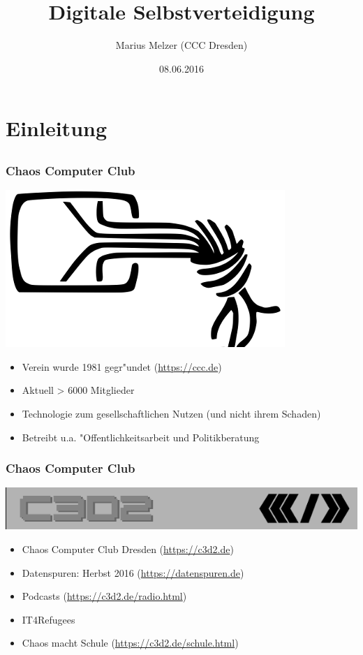 \documentclass[12pt, xcolor={svgnames,table}]{beamer}
\title{Digitale Selbstverteidigung}
\author{\small Marius Melzer (CCC Dresden)}
\date{08.06.2016}
\begin{document}
\maketitle

\section{Einleitung}
\subsection{}

\begin{frame}
    \frametitle{Chaos Computer Club}
    \begin{center}
	\includegraphics[height=0.2\textheight]{img/chaosknoten.png}
    \end{center}	
    \begin{itemize}
      \item<1-> Verein wurde 1981 gegr"undet (\url{https://ccc.de})
      \item<2-> Aktuell > 6000 Mitglieder
      \item<3-> Technologie zum gesellschaftlichen Nutzen (und nicht ihrem Schaden)
      \item<4-> Betreibt u.a. "Offentlichkeitsarbeit und Politikberatung
    \end{itemize}
\end{frame}

\begin{frame}
    \frametitle{Chaos Computer Club}
    \begin{center}
	\includegraphics[height=0.1\textheight]{img/c3d2_logo.png}
    \end{center}
    \begin{itemize}
      \item<1-> Chaos Computer Club Dresden (\url{https://c3d2.de})
      \item<2-> Datenspuren: Herbst 2016 (\url{https://datenspuren.de})
      \item<3-> Podcasts (\url{https://c3d2.de/radio.html})
      \item<4-> IT4Refugees
      \item<5-> Chaos macht Schule (\url{https://c3d2.de/schule.html})
    \end{itemize}
\end{frame}
\end{document}
